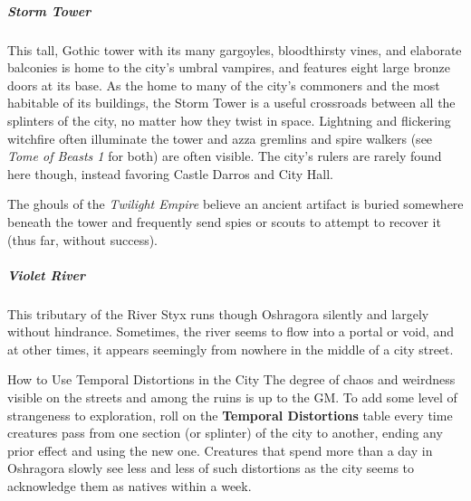 \documentclass[10pt,a4paper,twoside,bg=print,twocolumn,openany,nodeprecatedcode]{dndbook}
\begin{document}
\subparagraph{Storm Tower}
This tall, Gothic tower with its many gargoyles, bloodthirsty vines, and elaborate balconies is home to the city's umbral vampires, and features eight large bronze doors at its base. As the home to many of the city's commoners and the most habitable of its buildings, the Storm Tower is a useful crossroads between all the splinters of the city, no matter how they twist in space. Lightning and flickering witchfire often illuminate the tower and azza gremlins and spire walkers (see \textit{Tome of Beasts 1} for both) are often visible. The city's rulers are rarely found here though, instead favoring Castle Darros and City Hall.

The ghouls of the \textit{Twilight Empire} believe an ancient artifact is buried somewhere beneath the tower and frequently send spies or scouts to attempt to recover it (thus far, without success).

\subparagraph{Violet River}
This tributary of the River Styx runs though Oshragora silently and largely without hindrance. Sometimes, the river seems to flow into a portal or void, and at other times, it appears seemingly from nowhere in the middle of a city street.

\begin{DndSidebar}[float=!b]{How to Use Temporal Distortions in the City}
The degree of chaos and weirdness visible on the streets and among the ruins is up to the GM. To add some level of strangeness to exploration, roll on the \textbf{Temporal Distortions} table every time creatures pass from one section (or splinter) of the city to another, ending any prior effect and using the new one. Creatures that spend more than a day in Oshragora slowly see less and less of such distortions as the city seems to acknowledge them as natives within a week.



\end{DndSidebar}
\end{document}
